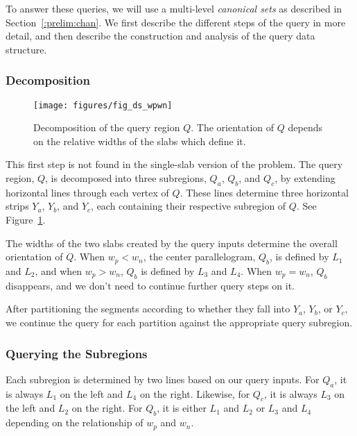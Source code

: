 To answer these queries, we will use a multi-level \emph{canonical sets} as described in Section~\ref{:prelim:chan}. We first describe the different steps of the query in more detail, and then describe the construction and analysis of the query data structure.


\subsubsection{Decomposition}

\begin{figure}[t]
\begin{center}
  \texttt{[image: figures/fig\_ds\_wpwn]}
  \caption[Decomposition of the query region $Q$.]{Decomposition of the query region $Q$. The orientation of $Q$ depends on the relative widths of the slabs which define it.}
  \label{fig:slabs:two:wpwn}
\end{center}
\end{figure}

This first step is not found in the single-slab version of the problem. The query region, $Q$, is decomposed into three subregions, $Q_a$, $Q_b$, and $Q_c$, by extending horizontal lines through each vertex of $Q$. These lines determine three horizontal strips $Y_a$, $Y_b$, and $Y_c$, each containing their respective subregion of $Q$. See Figure~\ref{fig:slabs:two:wpwn}.

The widths of the two slabs created by the query inputs determine the overall orientation of $Q$. When $w_p < w_n$, the center parallelogram, $Q_b$, is defined by $L_1$ and $L_2$, and when $w_p > w_n$, $Q_b$ is defined by $L_3$ and $L_4$. When $w_p = w_n$, $Q_b$ disappears, and we don't need to continue further query steps on it.

After partitioning the segments according to whether they fall into $Y_a$, $Y_b$, or $Y_c$, we continue the query for each partition against the appropriate query subregion.


\subsubsection{Querying the Subregions}

Each subregion is determined by two lines based on our query inputs. For $Q_a$, it is always $L_1$ on the left and $L_4$ on the right. Likewise, for $Q_c$, it is always $L_3$ on the left and $L_2$ on the right. For $Q_b$, it is either $L_1$ and $L_2$ or $L_3$ and $L_4$ depending on the relationship of $w_p$ and $w_n$.

